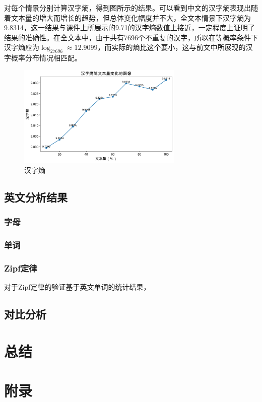 \documentclass[11pt]{article}
\begin{document}
	对每个情景分别计算汉字熵，得到图所示的结果。可以看到中文的汉字熵表现出随着文本量的增大而增长的趋势，但总体变化幅度并不大，全文本情景下汉字熵为9.8314，这一结果与课件上所展示的9.71的汉字熵数值上接近，一定程度上证明了结果的准确性。在全文本中，由于共有7696个不重复的汉字，所以在等概率条件下汉字熵应为$\log_27696 \approx 12.9099$，而实际的熵比这个要小，这与前文中所展现的汉字概率分布情况相匹配。
	
	\begin{figure}
		\centering
		\includegraphics[width=0.7\textwidth]{zh_entropy_vs_text_size.png}
		\caption{汉字熵}
		\label{fig:3.2} 
	\end{figure}
	
	\subsection{英文分析结果}
	\subsubsection{字母}
	\subsubsection{单词}
	\subsubsection{Zipf定律}
	对于Zipf定律的验证基于英文单词的统计结果，
	
	\subsection{对比分析}
	
	\section{总结}
	\section{附录}
\end{document}
